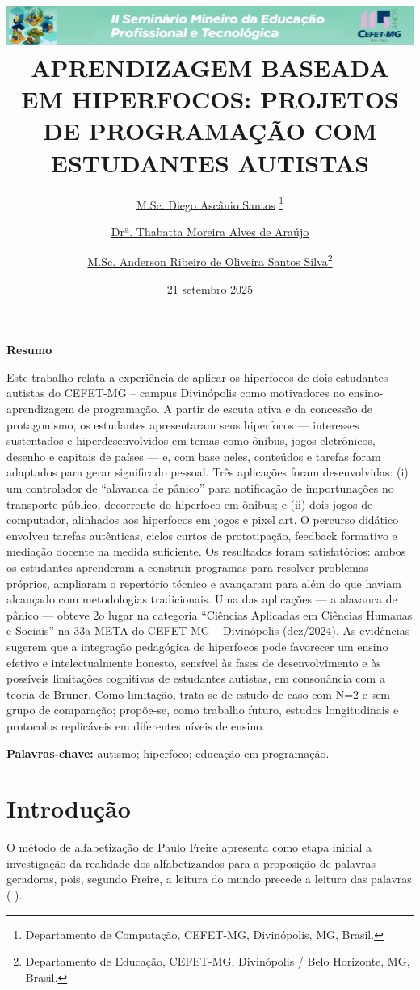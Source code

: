 \documentclass[
  12pt,
  a4paper,
]{article}
\title{\includegraphics[width=1\textwidth,height=\textheight]{./images/logo.png}
APRENDIZAGEM BASEADA EM HIPERFOCOS: PROJETOS DE PROGRAMAÇÃO COM
ESTUDANTES AUTISTAS}
\author{\href{mailto:ascanio@cefetmg.br}{M.Sc. Diego Ascânio Santos}
\thanks{Departamento de Computação, CEFET-MG, Divinópolis, MG, Brasil.} \and \href{mailto:thabatta@cefetmg.br}{Drª. Thabatta Moreira Alves de Araújo}\footnotemark[1] \and \href{mailto:andeersonribeiro@cefetmg.br}{M.Sc. Anderson Ribeiro de Oliveira Santos Silva}\thanks{Departamento de Educação, CEFET-MG, Divinópolis / Belo Horizonte, MG, Brasil.}}
\date{21 setembro 2025}
\begin{document}
\maketitle

\textbf{Resumo}

Este trabalho relata a experiência de aplicar os hiperfocos de dois
estudantes autistas do CEFET-MG -- campus Divinópolis como motivadores
no ensino-aprendizagem de programação. A partir de escuta ativa e da
concessão de protagonismo, os estudantes apresentaram seus hiperfocos
--- interesses sustentados e hiperdesenvolvidos em temas como ônibus,
jogos eletrônicos, desenho e capitais de países --- e, com base neles,
conteúdos e tarefas foram adaptados para gerar significado pessoal. Três
aplicações foram desenvolvidas: (i) um controlador de ``alavanca de
pânico'' para notificação de importunações no transporte público,
decorrente do hiperfoco em ônibus; e (ii) dois jogos de computador,
alinhados aos hiperfocos em jogos e pixel art. O percurso didático
envolveu tarefas autênticas, ciclos curtos de prototipação, feedback
formativo e mediação docente na medida suficiente. Os resultados foram
satisfatórios: ambos os estudantes aprenderam a construir programas para
resolver problemas próprios, ampliaram o repertório técnico e avançaram
para além do que haviam alcançado com metodologias tradicionais. Uma das
aplicações --- a alavanca de pânico --- obteve 2o lugar na categoria
``Ciências Aplicadas em Ciências Humanas e Sociais'' na 33a META do
CEFET-MG -- Divinópolis (dez/2024). As evidências sugerem que a
integração pedagógica de hiperfocos pode favorecer um ensino efetivo e
intelectualmente honesto, sensível às fases de desenvolvimento e às
possíveis limitações cognitivas de estudantes autistas, em consonância
com a teoria de Bruner. Como limitação, trata-se de estudo de caso com
N=2 e sem grupo de comparação; propõe-se, como trabalho futuro, estudos
longitudinais e protocolos replicáveis em diferentes níveis de ensino.

\textbf{Palavras-chave:} autismo; hiperfoco; educação em programação.

\section{Introdução}\label{sec:introducao}

O método de alfabetização de Paulo Freire apresenta como etapa inicial a
investigação da realidade dos alfabetizandos para a proposição de
palavras geradoras, pois, segundo Freire, a leitura do mundo precede a
leitura das palavras ( ).
\end{document}
